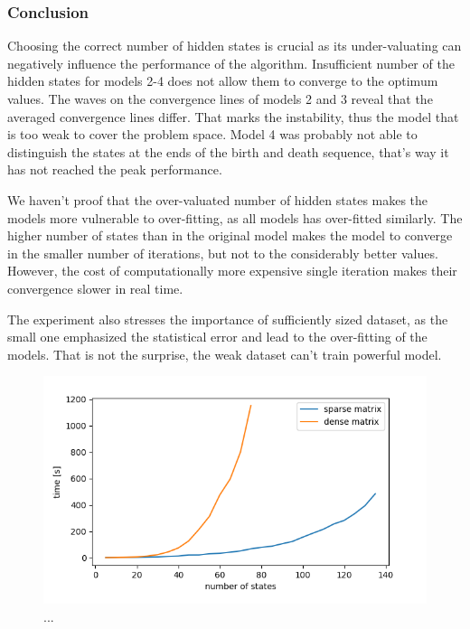 \documentclass[thesis=M,english]{FITthesis}[2012/10/20]
\begin{document}
\subsubsection*{ Conclusion }
Choosing the correct number of hidden states is crucial as its under-valuating can negatively influence the performance of the algorithm. Insufficient number of the hidden states for models 2-4 does not allow them to converge to the optimum values. The waves on the convergence lines of models 2 and 3 reveal that the averaged convergence lines differ. That marks the instability, thus the model that is too weak to cover the problem space. Model 4 was probably not able to distinguish the states at the ends of the birth and death sequence, that's way it has not reached the peak performance.

We haven't proof that the over-valuated number of hidden states makes the models more vulnerable to over-fitting, as all models has over-fitted similarly. The higher number of states than in the original model makes the model to converge in the smaller number of iterations, but not to the considerably better values. However, the cost of computationally more expensive single iteration makes their convergence slower in real time.

The experiment also stresses the importance of sufficiently sized dataset, as the small one emphasized the statistical error and lead to the over-fitting of the models. That is not the surprise, the weak dataset can't train powerful model. 


\begin{figure}
\centering
\includegraphics[width=1\linewidth]{img/ex5.2/time.png}
\caption{...}
\label{fig:bgtrain}
\end{figure}
\end{document}
